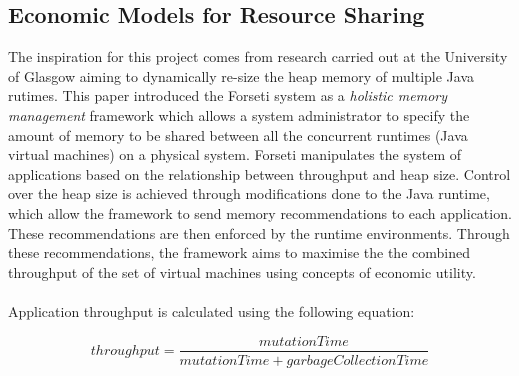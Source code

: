 \documentclass{l4proj}
\begin{document}
\subsection{Economic Models for Resource Sharing}
\label{forsetitalk}
\hspace*{1em} The inspiration for this project comes from research carried out at the University of Glasgow aiming to dynamically re-size the heap memory of multiple Java rutimes\cite{forseti}. This paper introduced the Forseti system as a \textit{holistic memory management} framework which allows a system administrator to specify the amount of memory to be shared between all the concurrent runtimes (Java virtual machines) on a physical system. Forseti manipulates the system of applications based on the relationship between throughput and heap size. Control over the heap size is achieved through modifications done to the Java runtime, which allow the framework to send memory recommendations to each application. These recommendations are then enforced by the runtime environments. Through these recommendations, the framework aims to maximise the the combined throughput of the set of virtual machines using concepts of economic utility.     
\\\\
Application throughput is calculated using the following equation:

\begin{equation}
throughput = \dfrac{mutationTime}{mutationTime + garbageCollectionTime}
\end{equation}
\end{document}
